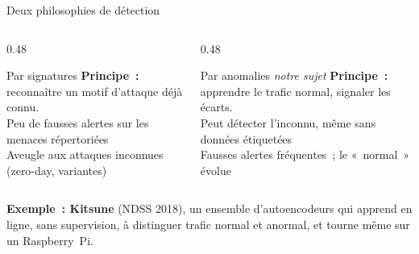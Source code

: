 \begin{frame}{Deux philosophies de détection}
  \begin{columns}[T]
    \begin{column}{0.48\textwidth}
      \begin{encadre}{Par signatures}
        \textbf{Principe~:} reconnaître un motif d'attaque déjà connu.\\[0.25cm]
        \oui Peu de fausses alertes sur les menaces répertoriées\\[0.1cm]
        \non Aveugle aux attaques inconnues (zero-day, variantes)
      \end{encadre}
    \end{column}
    \begin{column}{0.48\textwidth}
      \begin{encadre}{Par anomalies \hfill \textit{notre sujet}}
        \textbf{Principe~:} apprendre le trafic normal, signaler les écarts.\\[0.25cm]
        \oui Peut détecter l'inconnu, même sans données étiquetées\\[0.1cm]
        \non Fausses alertes fréquentes~; le «~normal~» évolue
      \end{encadre}
    \end{column}
  \end{columns}
  \vspace{0.4cm}
  \begin{pointcle}
    \textbf{Exemple~: Kitsune} (NDSS 2018), un ensemble d'autoencodeurs qui apprend en ligne,
    sans supervision, à distinguer trafic normal et anormal, et tourne même sur un Raspberry~Pi.
  \end{pointcle}
\end{frame}

